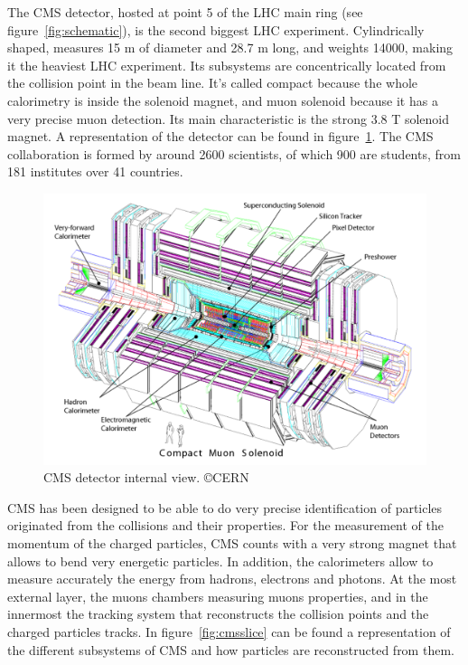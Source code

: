 The CMS detector, hosted at point 5 of the LHC main ring (see figure~\ref{fig:schematic}), is the second biggest LHC experiment. Cylindrically shaped, measures 15 m of diameter and 28.7 m long, and weights 14000, making it the heaviest LHC experiment. Its subsystems are concentrically located from the collision point in the beam line. It's called compact because the whole calorimetry is inside the solenoid magnet, and muon solenoid because it has a very precise muon detection. Its main characteristic is the strong 3.8 T solenoid magnet. A representation of the detector can be found in figure~\ref{fig:cmsdet}. The CMS collaboration is formed by around 2600 scientists, of which 900 are students, from 181 institutes over 41 countries. 

\begin{figure}[!Hhtbp]
  \begin{center}
    \includegraphics[width=\textwidth]{figs/CMS_det.pdf}
    \caption{CMS detector internal view. \copyright CERN}
    \label{fig:cmsdet}
  \end{center}
\end{figure}

CMS has been designed to be able to do very precise identification of particles originated from the collisions and their properties. For the measurement of the momentum of the charged particles, CMS counts with a very strong magnet that allows to bend very energetic particles. In addition, the calorimeters allow to measure accurately the energy from hadrons, electrons and photons. At the most external layer, the muons chambers measuring muons properties, and in the innermost the tracking system that reconstructs the collision points and the charged particles tracks. In figure~\ref{fig:cmsslice} can be found a representation of the different subsystems of CMS and how particles are reconstructed from them.

